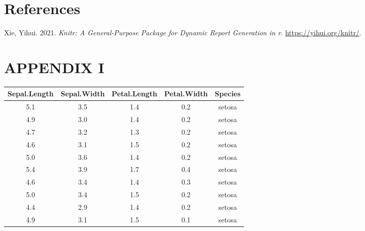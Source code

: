 \documentclass[
]{article}
\newlength{\cslhangindent}
\newlength{\cslentryspacingunit} %
\newenvironment{CSLReferences}[2] %
 {%
  \setlength{\parindent}{0pt}
  \ifodd #1
  \let\oldpar\par
  \def\par{\hangindent=\cslhangindent\oldpar}
  \fi
  \setlength{\parskip}{#2\cslentryspacingunit}
 }%
 {}
\begin{document}
\hypertarget{references}{%
\section*{References}\label{references}}

\hypertarget{refs}{}
\begin{CSLReferences}{1}{0}
\leavevmode{}%
Xie, Yihui. 2021. \emph{Knitr: A General-Purpose Package for Dynamic
Report Generation in r}. \url{https://yihui.org/knitr/}.

\end{CSLReferences}

\hypertarget{appendix-i}{%
\section*{APPENDIX I}\label{appendix-i}}

\begin{longtable}[]{@{}ccccc@{}}
\toprule
Sepal.Length & Sepal.Width & Petal.Length & Petal.Width & Species \\
\midrule
\endhead
5.1 & 3.5 & 1.4 & 0.2 & setosa \\
4.9 & 3.0 & 1.4 & 0.2 & setosa \\
4.7 & 3.2 & 1.3 & 0.2 & setosa \\
4.6 & 3.1 & 1.5 & 0.2 & setosa \\
5.0 & 3.6 & 1.4 & 0.2 & setosa \\
5.4 & 3.9 & 1.7 & 0.4 & setosa \\
4.6 & 3.4 & 1.4 & 0.3 & setosa \\
5.0 & 3.4 & 1.5 & 0.2 & setosa \\
4.4 & 2.9 & 1.4 & 0.2 & setosa \\
4.9 & 3.1 & 1.5 & 0.1 & setosa \\
\bottomrule
\end{longtable}
\end{document}

